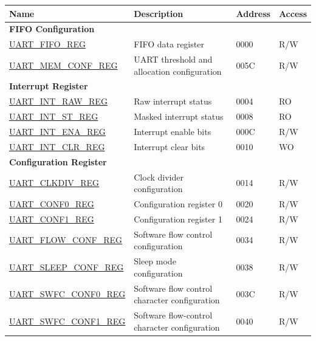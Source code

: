 \begin{longtable}{ | p{6cm} | p{7.2cm} | p{1.3cm} | p{1cm} | }
\hline\rowcolor{lightgray}
Name & Description &  Address & Access \\ \hline
\endhead
\multicolumn{4}{|l|}{\textbf{FIFO Configuration}} \\ \hline
\hyperref[regdesc:UARTFIFOREG]{UART\_FIFO\_REG} & FIFO data register & \hexprefix{}0000 & R/W \\ \hline
\hyperref[regdesc:UARTMEMCONFREG]{UART\_MEM\_CONF\_REG} & UART threshold and allocation configuration & \hexprefix{}005C & R/W \\ \hline
\multicolumn{4}{|l|}{\textbf{Interrupt Register}} \\ \hline
\hyperref[regdesc:UARTINTRAWREG]{UART\_INT\_RAW\_REG} & Raw interrupt status & \hexprefix{}0004 & RO \\ \hline
\hyperref[regdesc:UARTINTSTREG]{UART\_INT\_ST\_REG} & Masked interrupt status & \hexprefix{}0008 & RO \\ \hline
\hyperref[regdesc:UARTINTENAREG]{UART\_INT\_ENA\_REG} & Interrupt enable bits & \hexprefix{}000C & R/W \\ \hline
\hyperref[regdesc:UARTINTCLRREG]{UART\_INT\_CLR\_REG} & Interrupt clear bits & \hexprefix{}0010 & WO \\ \hline
\multicolumn{4}{|l|}{\textbf{Configuration Register}} \\ \hline
\hyperref[regdesc:UARTCLKDIVREG]{UART\_CLKDIV\_REG} & Clock divider configuration & \hexprefix{}0014 & R/W \\ \hline
\hyperref[regdesc:UARTCONF0REG]{UART\_CONF0\_REG} & Configuration register 0 & \hexprefix{}0020 & R/W \\ \hline
\hyperref[regdesc:UARTCONF1REG]{UART\_CONF1\_REG} & Configuration register 1 & \hexprefix{}0024 & R/W \\ \hline
\hyperref[regdesc:UARTFLOWCONFREG]{UART\_FLOW\_CONF\_REG} & Software flow control configuration & \hexprefix{}0034 & R/W \\ \hline
\hyperref[regdesc:UARTSLEEPCONFREG]{UART\_SLEEP\_CONF\_REG} & Sleep mode configuration & \hexprefix{}0038 & R/W \\ \hline
\hyperref[regdesc:UARTSWFCCONF0REG]{UART\_SWFC\_CONF0\_REG} & Software flow control character configuration & \hexprefix{}003C & R/W \\ \hline
\hyperref[regdesc:UARTSWFCCONF1REG]{UART\_SWFC\_CONF1\_REG} & Software flow-control character configuration & \hexprefix{}0040 & R/W \\ \hline

\end{longtable}
